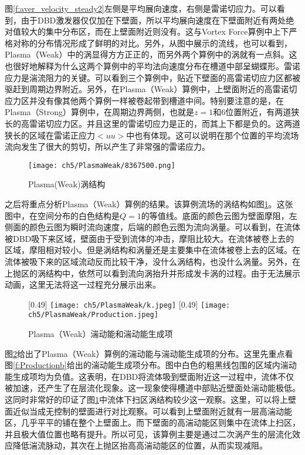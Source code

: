 图\ref{f:aver_velocity_steady2}左侧是平均展向速度，右侧是雷诺切应力。可以看到，由于DBD激发器仅仅加在下壁面，所以平均展向速度在下壁面附近有两处绝对值较大的集中分布区，而在上壁面附近则没有。这与Vortex Force算例中上下严格对称的分布情况形成了鲜明的对比。另外，从图中展示的流线，也可以看到，Plasma（Weak）中的涡显得方方正正的，而另外两个算例中的涡就有一点斜。这也很好地解释为什么这两个算例中的平均法向速度分布在槽道中部呈蝴蝶形。雷诺应力是湍流阻力的关键。可以看到三个算例中，贴近下壁面的高雷诺切应力区都被驱赶到周期边界附近。另外，在Plasma（Weak）算例中，上壁面附近的高雷诺切应力区并没有像其他两个算例一样被卷起带到槽道中间。特别要注意的是，在Plasma（Strong）算例中，在周期边界两侧，也就是$z=1$和6位置附近，有两道狭长的高雷诺切应力区。并且这里的雷诺切应力是正的，而其上下都是负的。这两道狭长的区域在雷诺正应力$<uu>$中也有体现。这可以说明在那个位置的平均流场流向发生了很大的剪切，所以产生了非常强的雷诺应力。

\begin{figure}[htb]
  \centering
  \texttt{[image: ch5/PlasmaWeak/8367500.png]}
  \caption{Plasma(Weak)涡结构}\label{f:PlasmaWeak_vortexstructure}
\end{figure}
之后将重点分析Plasma（Weak）算例的结果。该算例流场的涡结构如图\ref{f:PlasmaWeak_vortexstructure}。这张图中，在空间分布的白色结构是$Q=1$的等值线。底面的颜色云图为壁面摩阻，左侧面的颜色云图为瞬时流向速度，后端的颜色云图为流向涡量。可以看到，在流体被DBD吸下来区域，壁面由于受到流体的冲击，摩阻比较大。在流体被卷上去的区域，摩阻相对较小。但是涡结构和涡量还是主要集中在流体被卷上去的区域。在流体被吸下来的区域流动反而比较干净，没什么涡结构，也没什么涡量。另外，在上抛区的涡结构中，依然可以看到流向涡抬升并形成发卡涡的过程。由于无法展示动画，这里无法将这一过程充分展示出来。

\begin{figure}
  \centering
  [0.49\textwidth]
    {\texttt{[image: ch5/PlasmaWeak/k.jpeg]}}
  [0.49\textwidth]
    {\texttt{[image: ch5/PlasmaWeak/Production.jpeg]}}
  \caption{Plasma（Weak）湍动能和湍动能生成项}\label{f:production}
\end{figure}
图\ref{f:production}给出了Plasma（Weak）算例的湍动能与湍动能生成项的分布。这里先重点看图\ref{f:Productionb}给出的湍动能生成项分布。图中白色的粗黑线包围的区域内湍动能生成项均为负值。这表明，在DBD将流体吸到壁面附近这一过程中，流体不仅被加速，还产生了在层流化现象。这一现象使得槽道中部贴近壁面处湍动能极低。这同时非常好的印证了图\ref{f:PlasmaWeak_vortexstructure}中流体下扫区涡结构较少这一观察。这里，可以将上壁面近似当成无控制的壁面进行对比观察。可以看到上壁面附近就有一层高湍动能区，几乎平平的铺在整个上壁面上。而下壁面的高湍动能区则集中在流体上扫区，并且极大值位置也略有提升。所以可见，该算例主要是通过二次涡产生的层流化效应降低湍流脉动，其次在上抛区抬高高湍动能区的位置，从而实现减阻。

